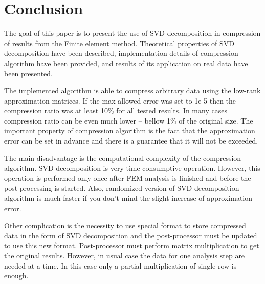 \section{Conclusion}
\label{sec:conclusion}

The goal of this paper is to present the use of SVD decomposition in compression of results from the Finite element method. Theoretical properties of SVD decomposition have been described, implementation details of compression algorithm have been provided, and results of its application on real data have been presented.

The implemented algorithm is able to compress arbitrary data using the low-rank approximation matrices. If the max allowed error was set to 1e-5 then the compression ratio was at least 10\% for all tested results. In many cases compression ratio can be even much lower -- bellow 1\% of the original size. The important property of compression algorithm is the fact that the approximation error can be set in advance and there is a guarantee that it will not be exceeded.

The main disadvantage is the computational complexity of the compression algorithm. SVD decomposition is very time consumptive operation. However, this operation is performed only once after FEM analysis is finished and before the post-processing is started. Also, randomized version of SVD decomposition algorithm is much faster if you don't mind the slight increase of approximation error. %

Other complication is the necessity to use special format to store compressed data in the form of SVD decomposition and the post-processor must be updated to use this new format. Post-processor must perform matrix multiplication to get the original results. However, in usual case the data for one analysis step are needed at a time. In this case only a partial multiplication of single row is enough.

